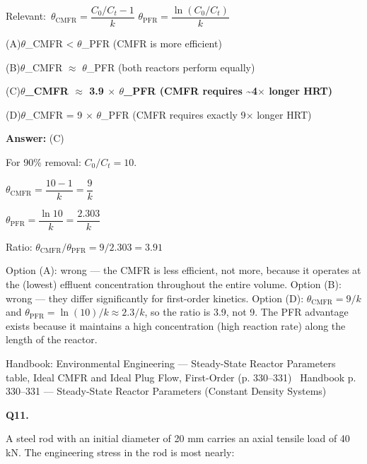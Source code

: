 \documentclass[11pt]{article}
\newcommand{\correct}[1]{\textbf{#1}\;{\color{accent}$\checkmark$}}
\newcommand{\optline}[2]{\par\noindent\hspace{1.2em}(#1)\hspace{0.6em}#2}
\begin{document}
{\small\color{soft}Relevant:}\ $\theta_{\text{CMFR}} = \dfrac{C_0/C_t - 1}{k}$ \quad $\theta_{\text{PFR}} = \dfrac{\ln(C_0/C_t)}{k}$\par\vspace{3pt}
\optline{A}{$\theta$\_CMFR < $\theta$\_PFR (CMFR is more efficient)}
\optline{B}{$\theta$\_CMFR $\approx$ $\theta$\_PFR (both reactors perform equally)}
\optline{C}{\correct{$\theta$\_CMFR $\approx$ 3.9 $\times$ $\theta$\_PFR (CMFR requires \textasciitilde{}4$\times$ longer HRT)}}
\optline{D}{$\theta$\_CMFR = 9 $\times$ $\theta$\_PFR (CMFR requires exactly 9$\times$ longer HRT)}
\par\vspace{3pt}
\vspace{2pt}\par\noindent\colorbox{boxbg}{\parbox{\dimexpr\linewidth-2\fboxsep\relax}{%
\vspace{2pt}\textbf{Answer:} (C)\par\vspace{2pt}
{\small For 90\% removal: $C_0/C_t = 10$.

$\theta_{\text{CMFR}} = \dfrac{10-1}{k} = \dfrac{9}{k}$

$\theta_{\text{PFR}} = \dfrac{\ln 10}{k} = \dfrac{2.303}{k}$

Ratio: $\theta_{\text{CMFR}}/\theta_{\text{PFR}} = 9/2.303 = 3.91$

Option (A): wrong --- the CMFR is less efficient, not more, because it operates at the (lowest) effluent concentration throughout the entire volume. Option (B): wrong --- they differ significantly for first-order kinetics. Option (D): $\theta_{\text{CMFR}} = 9/k$ and $\theta_{\text{PFR}} = \ln(10)/k \approx 2.3/k$, so the ratio is 3.9, not 9. The PFR advantage exists because it maintains a high concentration (high reaction rate) along the length of the reactor.}\par\vspace{2pt}
{\footnotesize\color{soft}Handbook: Environmental Engineering --- Steady-State Reactor Parameters table, Ideal CMFR and Ideal Plug Flow, First-Order (p. 330--331) \textbullet\ Handbook p. 330--331 --- Steady-State Reactor Parameters (Constant Density Systems)}\vspace{2pt}
}}
\vspace{9pt}
\filbreak
\textbf{\color{accent}Q11.}\par\vspace{2pt}
A steel rod with an initial diameter of 20 mm carries an axial tensile load of 40 kN. The engineering stress in the rod is most nearly:
\end{document}
